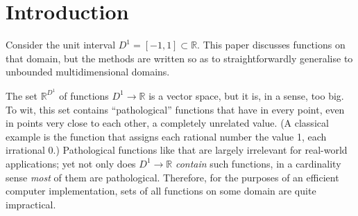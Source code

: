 \documentclass[final,sigplan]{acmart}\settopmatter{printfolios=true,printccs=false,printacmref=false}
\theoremstyle{acmplain}
\theoremstyle{acmdefinition}
\begin{document}


\maketitle


\section{Introduction}

Consider the unit interval $D^1 = [-1,1] \subset \mathbb{R}$.
This paper discusses functions on that domain, but the methods are written so as to straightforwardly generalise to unbounded multidimensional domains.

The set $\mathbb{R}^{D^1}$ of functions $D^1 \to \mathbb{R}$ is a vector space, but it is, in a sense, too big. To wit, this set contains “pathological” functions that have in every point, even in points very close to each other, a completely unrelated value. (A classical example is the function that assigns each rational number the value 1, each irrational 0.) Pathological functions like that are largely irrelevant for real-world applications; yet not only does $D^1 \to \mathbb{R}$ \emph{contain} such functions, in a cardinality sense \emph{most} of them are pathological. Therefore, for the purposes of an efficient computer implementation, sets of all functions on some domain are quite impractical.
\end{document}
